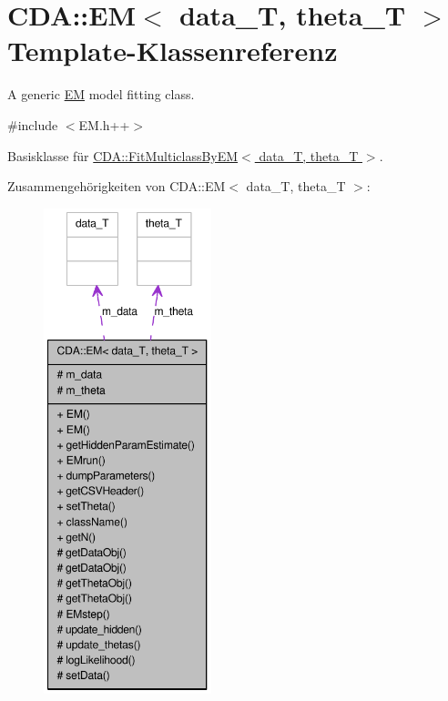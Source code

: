 \hypertarget{classCDA_1_1EM}{
\section{CDA::EM$<$ data\_\-T, theta\_\-T $>$ Template-\/Klassenreferenz}
\label{classCDA_1_1EM}
}


A generic \hyperlink{classCDA_1_1EM}{EM} model fitting class.  




{\ttfamily \#include $<$EM.h++$>$}



Basisklasse für \hyperlink{classCDA_1_1FitMulticlassByEM}{CDA::FitMulticlassByEM$<$ data\_\-T, theta\_\-T $>$}.



Zusammengehörigkeiten von CDA::EM$<$ data\_\-T, theta\_\-T $>$:\nopagebreak
\begin{figure}[H]
\begin{center}
\leavevmode
\includegraphics[height=400pt]{classCDA_1_1EM__coll__graph}
\end{center}
\end{figure}
